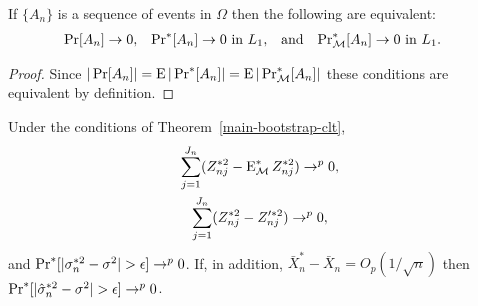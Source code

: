 \documentclass[11pt]{article}
\begin{document}
\begin{lem}\label{equivalent-convergence-from-lie-lemma}
  If $\{A_n\}$ is a sequence of events in $\Omega$ then the following
  are equivalent:
  \begin{align*}
  \operatorname{Pr}[A_n] &\to 0, &
  \operatorname{Pr}^*[A_n] &\to 0 \text{\ in\ }L_1, &
  &\text{and}&
  \operatorname{Pr}_{\mathcal{M}}^*[A_n] &\to 0 \text{\ in\ }L_1.
  \end{align*}
\end{lem}
\begin{proof}
  Since $|\operatorname{Pr}[A_n]| = \operatorname{E} |\operatorname{Pr}^*[A_n]| = \operatorname{E} |\operatorname{Pr}^*_{\mathcal{M}}[A_n]|$ these
  conditions are equivalent by definition.
\end{proof}

\begin{lem}\label{bootstrap-variance-convergence-lemma}
Under the conditions of Theorem~\ref{main-bootstrap-clt},
\begin{gather}
  \label{eq:25}
  \sum_{j=1}^{J_n} (Z_{nj}^{*2} - \operatorname{E}_{\mathcal{M}}^* Z_{nj}^{*2}) \to^p 0,
  \\
  \label{eq:26}
  \sum_{j=1}^{J_n} (Z_{nj}^{*2} - Z_{nj}^{\prime*2}) \to^p 0,
\end{gather}
and $\operatorname{Pr}^*[ |\sigma_n^{*2} - \sigma^2| > \epsilon] \to^p 0$.
If, in addition, $\bar X_n^* - \bar X_n = O_p(1/\sqrt{n})$ then
$\operatorname{Pr}^*[ |\hat\sigma_n^{*2} - \sigma^2| > \epsilon] \to^p 0$.
\end{lem}
\end{document}
